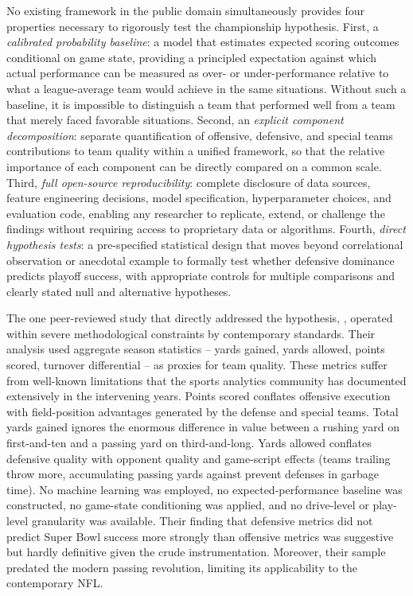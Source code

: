 No existing framework in the public domain simultaneously provides four properties necessary to rigorously test the championship hypothesis. First, a \emph{calibrated probability baseline}: a model that estimates expected scoring outcomes conditional on game state, providing a principled expectation against which actual performance can be measured as over- or under-performance relative to what a league-average team would achieve in the same situations. Without such a baseline, it is impossible to distinguish a team that performed well from a team that merely faced favorable situations. Second, an \emph{explicit component decomposition}: separate quantification of offensive, defensive, and special teams contributions to team quality within a unified framework, so that the relative importance of each component can be directly compared on a common scale. Third, \emph{full open-source reproducibility}: complete disclosure of data sources, feature engineering decisions, model specification, hyperparameter choices, and evaluation code, enabling any researcher to replicate, extend, or challenge the findings without requiring access to proprietary data or algorithms. Fourth, \emph{direct hypothesis tests}: a pre-specified statistical design that moves beyond correlational observation or anecdotal example to formally test whether defensive dominance predicts playoff success, with appropriate controls for multiple comparisons and clearly stated null and alternative hypotheses.

The one peer-reviewed study that directly addressed the hypothesis, \textcite{robst2011defense}, operated within severe methodological constraints by contemporary standards. Their analysis used aggregate season statistics  -- yards gained, yards allowed, points scored, turnover differential  -- as proxies for team quality. These metrics suffer from well-known limitations that the sports analytics community has documented extensively in the intervening years. Points scored conflates offensive execution with field-position advantages generated by the defense and special teams. Total yards gained ignores the enormous difference in value between a rushing yard on first-and-ten and a passing yard on third-and-long. Yards allowed conflates defensive quality with opponent quality and game-script effects (teams trailing throw more, accumulating passing yards against prevent defenses in garbage time). No machine learning was employed, no expected-performance baseline was constructed, no game-state conditioning was applied, and no drive-level or play-level granularity was available. Their finding that defensive metrics did not predict Super Bowl success more strongly than offensive metrics was suggestive but hardly definitive given the crude instrumentation. Moreover, their sample predated the modern passing revolution, limiting its applicability to the contemporary NFL.

